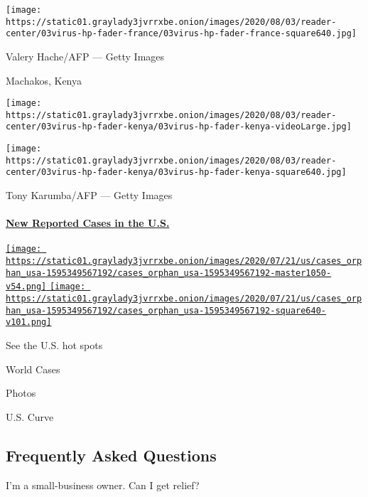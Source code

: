 \texttt{[image: https://static01.graylady3jvrrxbe.onion/images/2020/08/03/reader-center/03virus-hp-fader-france/03virus-hp-fader-france-square640.jpg]}

 Valery Hache/AFP --- Getty Images

Machakos, Kenya

\texttt{[image: https://static01.graylady3jvrrxbe.onion/images/2020/08/03/reader-center/03virus-hp-fader-kenya/03virus-hp-fader-kenya-videoLarge.jpg]}

\texttt{[image: https://static01.graylady3jvrrxbe.onion/images/2020/08/03/reader-center/03virus-hp-fader-kenya/03virus-hp-fader-kenya-square640.jpg]}

 Tony Karumba/AFP --- Getty Images

\hypertarget{new-reported-cases-in-the-us}{%
\paragraph{\texorpdfstring{\href{https://www.nytimes3xbfgragh.onion/interactive/2020/us/coronavirus-us-cases.html}{New
Reported Cases in the
U.S.}}{New Reported Cases in the U.S.}}\label{new-reported-cases-in-the-us}}

\href{https://www.nytimes3xbfgragh.onion/interactive/2020/us/coronavirus-us-cases.html}{\texttt{[image: https://static01.graylady3jvrrxbe.onion/images/2020/07/21/us/cases\_orphan\_usa-1595349567192/cases\_orphan\_usa-1595349567192-master1050-v54.png]}
\texttt{[image: https://static01.graylady3jvrrxbe.onion/images/2020/07/21/us/cases\_orphan\_usa-1595349567192/cases\_orphan\_usa-1595349567192-square640-v101.png]}}

See the U.S. hot spots

World Cases

Photos

U.S. Curve

\hypertarget{frequently-asked-questions}{%
\subsection{Frequently Asked
Questions}\label{frequently-asked-questions}}

 I'm a small-business owner. Can I get relief?


